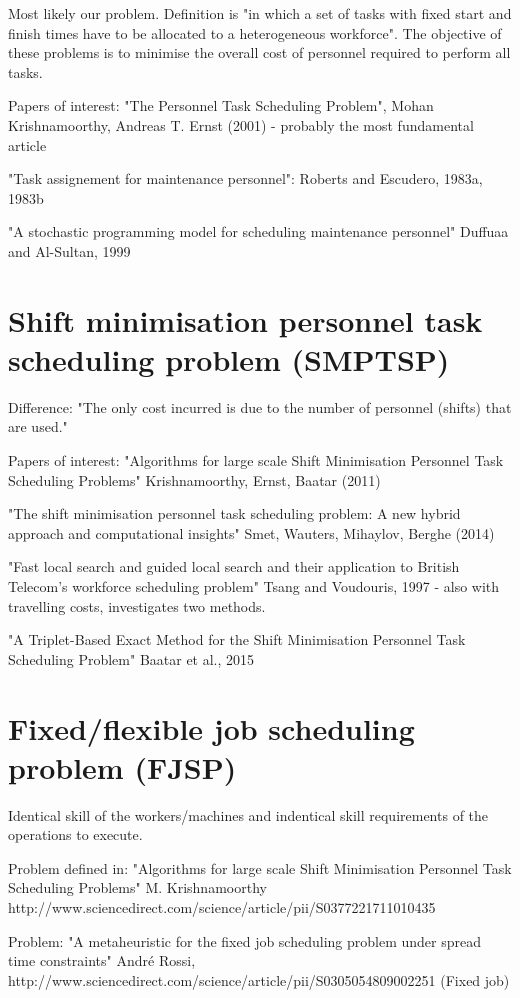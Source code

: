 Most likely our problem. Definition is "in which a set of tasks with fixed start and finish times have to be allocated to a heterogeneous workforce". The objective of these problems is to minimise the overall cost of personnel required to perform all tasks.

Papers of interest:
"The Personnel Task Scheduling Problem", Mohan Krishnamoorthy, Andreas T. Ernst (2001) - probably the most fundamental article

"Task assignement for maintenance personnel": Roberts and Escudero, 1983a, 1983b

"A stochastic programming model for scheduling maintenance personnel" Duffuaa and Al-Sultan, 1999

\section{Shift minimisation personnel task scheduling problem (SMPTSP)}\label{SMTSP}
Difference: "The only cost incurred is due to the number of personnel (shifts) that are used."

Papers of interest:
"Algorithms for large scale Shift Minimisation Personnel Task Scheduling Problems" Krishnamoorthy, Ernst, Baatar (2011)

"The shift minimisation personnel task scheduling problem: A new hybrid approach and computational insights" Smet, Wauters, Mihaylov, Berghe (2014)

"Fast local search and guided local search and their application to British Telecom's workforce scheduling problem" Tsang and Voudouris, 1997 - also with travelling costs, investigates two methods.

"A Triplet-Based Exact Method for the Shift Minimisation Personnel Task Scheduling Problem" Baatar et al., 2015

\section{Fixed/flexible job scheduling problem (FJSP)}\label{FJSP}
Identical skill of the workers/machines and indentical skill requirements of the operations to execute.

Problem defined in: "Algorithms for large scale Shift Minimisation Personnel Task Scheduling Problems" M. Krishnamoorthy
http://www.sciencedirect.com/science/article/pii/S0377221711010435

Problem: "A metaheuristic for the fixed job scheduling problem under spread time constraints" André Rossi, http://www.sciencedirect.com/science/article/pii/S0305054809002251 (Fixed job)

